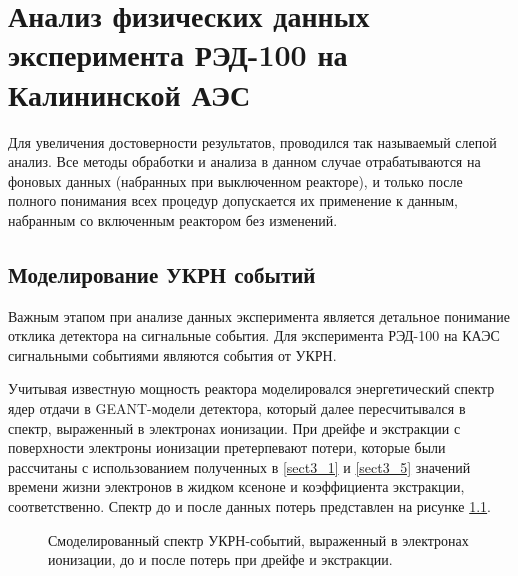 \chapter{Анализ физических данных эксперимента РЭД-100 на Калининской АЭС} 
\label{chapt4}
Для увеличения достоверности результатов, проводился так называемый слепой анализ. Все методы обработки и анализа в данном случае отрабатываются на фоновых данных (набранных при выключенном реакторе), и только после полного понимания всех процедур допускается их применение к данным, набранным со включенным реактором без изменений.
\section{Моделирование УКРН событий}
\label{sect4_1}
Важным этапом при анализе данных эксперимента является детальное понимание отклика детектора на сигнальные события. Для эксперимента РЭД-100 на КАЭС сигнальными событиями являются события от УКРН. 

Учитывая известную мощность реактора моделировался энергетический спектр ядер отдачи в GEANT-модели детектора, который далее пересчитывался в спектр, выраженный в электронах ионизации. При дрейфе и экстракции с поверхности электроны ионизации претерпевают потери, которые были рассчитаны с использованием полученных в \ref{sect3_1} и \ref{sect3_5} значений времени жизни электронов в жидком ксеноне и коэффициента экстракции, соответственно. Спектр до и после данных потерь представлен на рисунке \ref{img:cevnscpectrum}.
\begin{figure}[H]	
	\caption{Смоделированный спектр УКРН-событий, выраженный в электронах ионизации, до и после потерь при дрейфе и экстракции.}
	\label{img:cevnscpectrum}
\end{figure}

